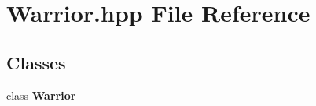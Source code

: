 \section{Warrior.\-hpp File Reference}
\label{_warrior_8hpp}
\subsection*{Classes}
\begin{DoxyCompactItemize}
\item 
class {\bf Warrior}
\end{DoxyCompactItemize}
